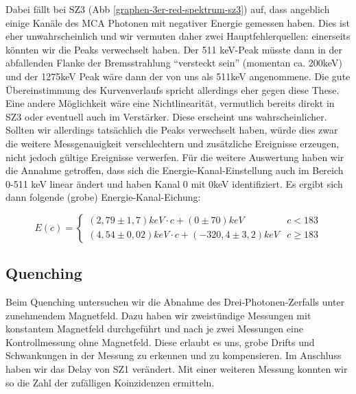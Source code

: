 Dabei fällt bei SZ3 (Abb \ref{graphen-3er-red-spektrum-sz3}) auf, dass angeblich einige Kanäle des MCA Photonen mit negativer Energie gemessen haben. Dies ist eher unwahrscheinlich und wir vermuten daher zwei Hauptfehlerquellen: einerseits könnten wir die Peaks verwechselt haben. Der 511 keV-Peak müsste dann in der abfallenden Flanke der Bremsstrahlung "`versteckt sein"' (momentan ca. 200keV) und der 1275keV Peak wäre dann der von uns als 511keV angenommene. Die gute Übereinstimmung des Kurvenverlaufs spricht allerdings eher gegen diese These. Eine andere Möglichkeit wäre eine Nichtlinearität, vermutlich bereits direkt in SZ3 oder eventuell auch im Verstärker. Diese erscheint uns wahrscheinlicher. Sollten wir allerdings tatsächlich die Peaks verwechselt haben, würde dies zwar die weitere Messgenauigkeit verschlechtern und zusätzliche Ereignisse erzeugen, nicht jedoch gültige Ereignisse verwerfen. Für die weitere Auswertung haben wir die Annahme getroffen, dass sich die Energie-Kanal-Einstellung auch im Bereich 0-511 keV linear ändert und haben Kanal 0 mit 0keV identifiziert. Es ergibt sich dann folgende (grobe) Energie-Kanal-Eichung:

\begin{equation}
 E(c) = \begin{cases}
 ( 2,79 \pm 1,7) keV \cdot c + (0 \pm 70) keV & c < 183 \\
 (4,54 \pm 0,02) keV \cdot c + (-320,4 \pm 3,2) keV & c \geq 183
 \end{cases}
\end{equation}


\subsection{Quenching}

Beim Quenching untersuchen wir die Abnahme des Drei-Photonen-Zerfalls unter zunehmendem Magnetfeld. Dazu haben wir zweistündige Messungen mit konstantem Magnetfeld durchgeführt und nach je zwei Messungen eine Kontrollmessung ohne Magnetfeld. Diese erlaubt es uns, grobe Drifts und Schwankungen in der Messung zu erkennen und zu kompensieren. Im Anschluss haben wir das Delay von SZ1 verändert. Mit einer weiteren Messung konnten wir so die Zahl der zufälligen Koinzidenzen ermitteln.


